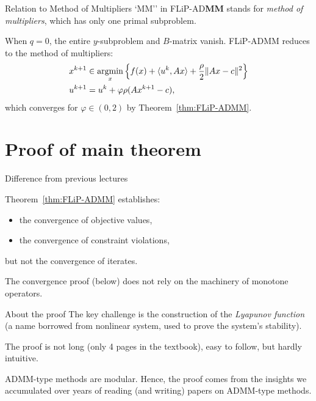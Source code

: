 \documentclass[10pt,mathserif]{beamer}
\begin{document}
\begin{frame}{Relation to Method of Multipliers}
`MM'' in FLiP-AD\textbf{MM} stands for \emph{method of multipliers}, which has only one primal subproblem.
\bigskip

When $q=0$, the entire $y$-subproblem and $B$-matrix vanish. FLiP-ADMM reduces to the method of multipliers:
\begin{align*}
x^{k+1}&\in
 \operatorname*{argmin}_{x} \left\{f(x) + \langle u^k, Ax\rangle +\frac{\rho}{2}\| Ax-c\|^2\right\}\\
u^{k+1}&=u^k+\varphi\rho(Ax^{k+1}-c),
\end{align*}
which converges for $\varphi\in(0,2)$ by Theorem~\ref{thm:FLiP-ADMM}.
\end{frame}

\section{Proof of main theorem}

\begin{frame}{Difference from previous lectures}

Theorem~\ref{thm:FLiP-ADMM} establishes:
\begin{itemize}
  \item the convergence of objective values,
  \item the convergence of constraint violations,
\end{itemize}
but not the convergence of iterates.
\bigskip

The convergence proof (below) does not rely on the machinery of monotone operators.
\end{frame}

\begin{frame}{About the proof}
The key challenge is the construction of the \emph{Lyapunov function} (a name borrowed from nonlinear system, used to prove the system's stability).
\bigskip

The proof is not long (only 4 pages in the textbook), easy to follow, but hardly intuitive.
\bigskip

ADMM-type methods are modular. %
Hence, the proof comes from the insights we accumulated over years of reading (and writing) papers on ADMM-type methods.
\end{frame}
\end{document}
